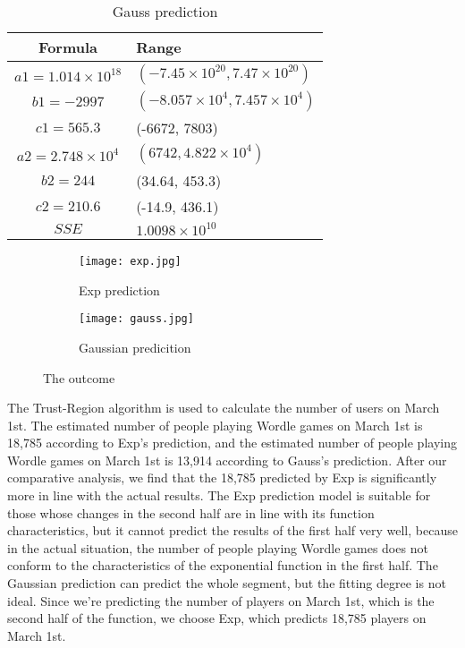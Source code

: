 \documentclass[12pt]{article}  %
\begin{document}
\begin{table}[!htbp]
	\begin{center}
		\caption{Gauss prediction}
		\begin{tabular}{cl}
			\toprule
			\multicolumn{1}{m{3cm}}{\centering Formula}
			&\multicolumn{1}{m{8cm}}{\centering Range}\\
			\midrule
			$a1 =  1.014\times 10^{18} $&   \qquad\qquad$(-7.45\times 10^{20}, 7.47\times 10^{20})$\\
			$b1 =  -2997$&   \qquad\qquad $(-8.057\times 10^{4}, 7.457\times 10^{4})$\\
			$c1 =  565.3$ &  \qquad\qquad  (-6672, 7803)\\
			$a2 =  2.748\times 10^{4}$&   \qquad\qquad $(6742, 4.822\times 10^{4})$\\
			$b2 =  244 $&   \qquad\qquad (34.64, 453.3)\\
			$c2 =  210.6$ &  \qquad\qquad  (-14.9, 436.1)\\
			$SSE$ &  \qquad\qquad $1.0098\times 10^{10}$\\
			\bottomrule
		\end{tabular}\label{tb:notation}
	\end{center}
\end{table}


\begin{figure}[htbp]
	
	\begin{subfigure}[b]{.5\textwidth}
		\texttt{[image: exp.jpg]}
		\caption{Exp prediction}\label{subfig:left}
	\end{subfigure}
	\begin{subfigure}[b]{.5\textwidth}
		\texttt{[image: gauss.jpg]}
		\caption{Gaussian predicition}\label{subfig:right}
	\end{subfigure}
	\caption{The outcome }\label{fig:subfigures}
	\end{figure}



The Trust-Region algorithm is used to calculate the number of users on March 1st. The estimated number of people playing Wordle games on March 1st is 18,785 according to Exp's prediction, and the estimated number of people playing Wordle games on March 1st is 13,914 according to Gauss's prediction. After our comparative analysis, we find that the 18,785 predicted by Exp is significantly more in line with the actual results. The Exp prediction model is suitable for those whose changes in the second half are in line with its function characteristics, but it cannot predict the results of the first half very well, because in the actual situation, the number of people playing Wordle games does not conform to the characteristics of the exponential function in the first half. The Gaussian prediction can predict the whole segment, but the fitting degree is not ideal. Since we're predicting the number of players on March 1st, which is the second half of the function, we choose Exp, which predicts 18,785 players on March 1st.\\
\end{document}
